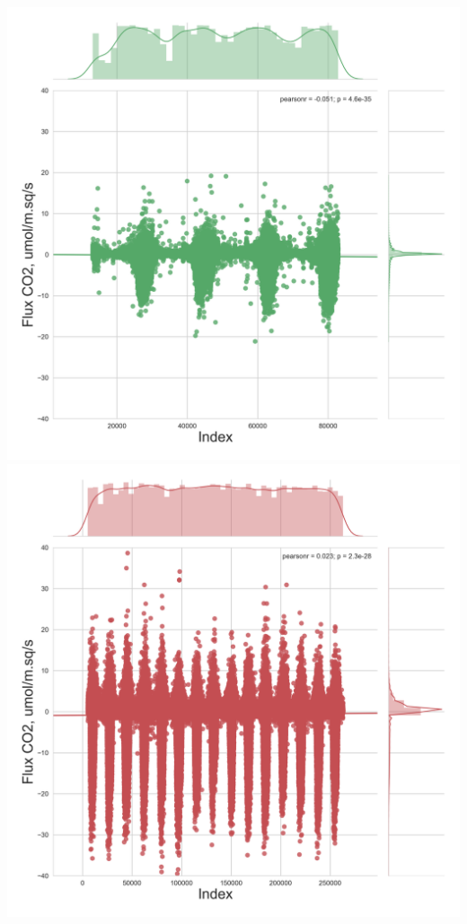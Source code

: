 \documentclass{beamer}
\begin{document}
\begin{frame}
\begin{columns}[t]
\centering
\includegraphics[width=\textwidth]{FvsTimeDen/CA-NS6.png}\\
\includegraphics[width=\textwidth]{FvsTimeDen/CA-Oas.png}

\end{columns}
\end{frame}
\end{document}
